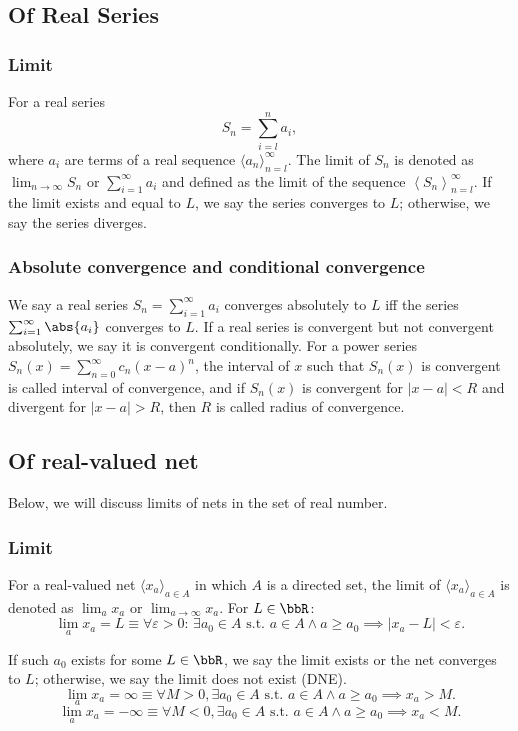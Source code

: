 \subsection{Of Real Series}
\subsubsection{Limit}
For a real series
\[S_n = \sum_{i=l}^n a_i,\]
where \(a_i\) are terms of a real sequence \(\langle a_n\rangle_{n=l}^{\infty}\). The limit of \(S_n\) is denoted as \(\lim_{n\to\infty}S_n\) or \(\sum_{i=1}^{\infty}a_i\) and defined as the limit of the sequence \(\left\langle S_n\right\rangle_{n=l}^{\infty}\). If the limit exists and equal to $L$, we say the series converges to $L$; otherwise, we say the series diverges.
\subsubsection{Absolute convergence and conditional convergence}
We say a real series $S_n=\sum_{i=1}^{\infty}a_i$ converges absolutely to $L$ iff the series $\sum_{i=1}^{\infty}\abs{a_i}$ converges to $L$. If a real series is convergent but not convergent absolutely, we say it is convergent conditionally.
For a power series $S_n(x)=\sum_{n=0}^{\infty}c_n(x-a)^n$, the interval of $x$ such that $S_n(x)$ is convergent is called interval of convergence, and if $S_n(x)$ is convergent for $|x-a|<R$ and divergent for $|x-a|>R$, then $R$ is called radius of convergence.
\subsection{Of real-valued net}
Below, we will discuss limits of nets in the set of real number.
\subsubsection{Limit}
For a real-valued net $\langle x_a\rangle_{a\in A}$ in which $A$ is a directed set, the limit of $\langle x_a\rangle_{a\in A}$ is denoted as $\lim_a x_a$ or $\lim_{a\to\infty} x_a$. For $L\in\bbR$:
\[\lim_ax_a = L \equiv \forall \varepsilon > 0:\, \exists a_0 \in A\text{\ s.t.\ } a\in A\land a\ge a_0\implies |x_a - L| < \varepsilon.\]

If such $a_0$ exists for some $L\in\bbR$, we say the limit exists or the net converges to $L$; otherwise, we say the limit does not exist (DNE).
\[\lim_{a}x_a=\infty \equiv \forall M > 0, \exists a_0 \in A \text{\ s.t.\ } a\in A\land a\geq a_0 \implies x_a > M.\]
\[\lim_{a}x_a=-\infty \equiv \forall M < 0, \exists a_0 \in A \text{\ s.t.\ } a\in A\land a\geq a_0 \implies x_a < M.\]
